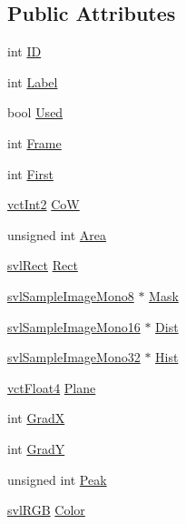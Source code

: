 \subsection*{Public Attributes}
\begin{DoxyCompactItemize}
\item 
int \hyperlink{classoni_plane_a8e124f1045514de627589b4d12c399de}{I\-D}
\item 
int \hyperlink{classoni_plane_ab36fafd8fdf3ffee9c6db1c75046698b}{Label}
\item 
bool \hyperlink{classoni_plane_a341b7fd56afc83f1c52a23339d2360af}{Used}
\item 
int \hyperlink{classoni_plane_a320042420f8fc8bb7e9627d20b03770a}{Frame}
\item 
int \hyperlink{classoni_plane_a2e074a995873b6ee68b72139a804f58e}{First}
\item 
\hyperlink{vct_fixed_size_vector_types_8h_add8c88eb6a432b15f14b866b9c35325f}{vct\-Int2} \hyperlink{classoni_plane_a9abe6029f64b043610124e75e9cb59e1}{Co\-W}
\item 
unsigned int \hyperlink{classoni_plane_a5fd10add329c5a691cdbeabe0544d0a7}{Area}
\item 
\hyperlink{structsvl_rect}{svl\-Rect} \hyperlink{classoni_plane_afd6f4fda85393983081d8fc25d3af0d5}{Rect}
\item 
\hyperlink{svl_sample_image_types_8h_a812ff42c7181179f558b68c43eeacee5}{svl\-Sample\-Image\-Mono8} $\ast$ \hyperlink{classoni_plane_aa8c339388f6941761ce99960758dff87}{Mask}
\item 
\hyperlink{svl_sample_image_types_8h_a0d4a39c480e3245d7f92d6699aa17848}{svl\-Sample\-Image\-Mono16} $\ast$ \hyperlink{classoni_plane_a94c9179a4a465e6af6b0933bd8830dd5}{Dist}
\item 
\hyperlink{svl_sample_image_types_8h_ac5d9d107eabb65b55f67d2a70ccf2cd6}{svl\-Sample\-Image\-Mono32} $\ast$ \hyperlink{classoni_plane_acc84136ccc7427a26e0ddd9b167ae503}{Hist}
\item 
\hyperlink{vct_fixed_size_vector_types_8h_a9bdca56ff054c73af41673cb9f5a4d94}{vct\-Float4} \hyperlink{classoni_plane_acde480a1ed54a84b6516b80f55149c08}{Plane}
\item 
int \hyperlink{classoni_plane_a0786845b82ff27e429fb4b20ae53b955}{Grad\-X}
\item 
int \hyperlink{classoni_plane_aacc36750673c9b1775dab107bcde5ae2}{Grad\-Y}
\item 
unsigned int \hyperlink{classoni_plane_a5b0c0a28d09f27c879464b4ddf67578e}{Peak}
\item 
\hyperlink{structsvl_r_g_b}{svl\-R\-G\-B} \hyperlink{classoni_plane_a4b3dddc3df25b2a09d40e0bfb6382bef}{Color}
\end{DoxyCompactItemize}


